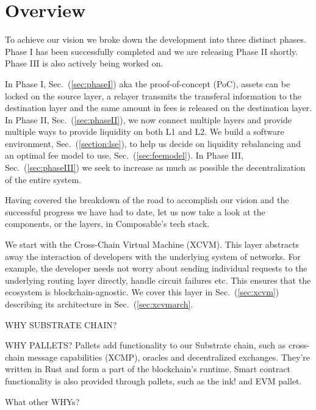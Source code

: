\section{Overview}

To achieve our vision we broke down the development into three distinct phases.
%
Phase I has been successfully completed and we are releasing Phase II shortly. Phase III is also actively being worked on.

In Phase I, Sec.~(\ref{sec:phaseI}) aka the proof-of-concept (PoC), assets can be locked on the source layer, a relayer transmits the transferal information to the destination layer and the same amount in fees is released on the destination layer.
%
In Phase II, Sec.~(\ref{sec:phaseII}), we now connect multiple layers and provide multiple ways to provide liquidity on both L1 and L2. We build a software environment, Sec.~(\ref{section:lse}), to help us decide on liquidity rebalancing and an optimal fee model to use, Sec.~(\ref{sec:feemodel}).
%
In Phase III, Sec.~(\ref{sec:phaseIII}) we seek to increase as much as possible the decentralization of the entire system.

Having covered the breakdown of the road to accomplish our vision and the successful progress we have had to date, let us now take a look at the components, or the layers, in Composable's tech stack.

We start with the Cross-Chain Virtual Machine (XCVM).
%
This layer abstracts away the interaction of developers with the underlying system of networks. For example, the developer needs not worry about sending individual requests to the underlying routing layer directly, handle circuit failures etc.
%
This ensures that the ecosystem is blockchain-agnostic. We cover this layer in Sec.~(\ref{sec:xcvm}) describing its architecture in Sec.~(\ref{sec:xcvmarch}.


WHY SUBSTRATE CHAIN?

WHY PALLETS?
Pallets add functionality to our Substrate chain, such as cross-chain message capabilities (XCMP), oracles and decentralized exchanges. They’re written in Rust and form a part of the blockchain’s runtime. Smart contract functionality is also provided through pallets, such as the ink! and EVM pallet. 

What other WHYs?
